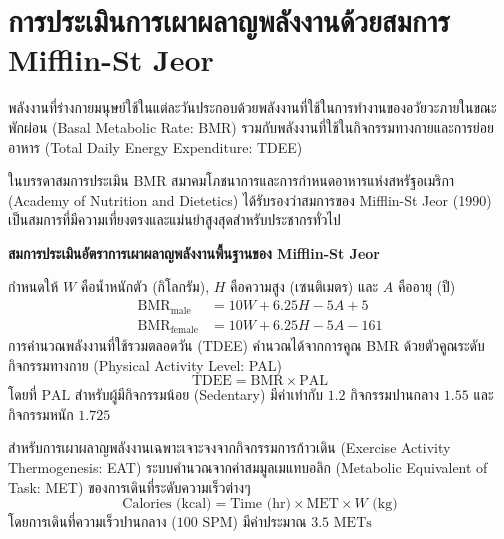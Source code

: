 \section{การประเมินการเผาผลาญพลังงานด้วยสมการ Mifflin-St Jeor}
พลังงานที่ร่างกายมนุษย์ใช้ในแต่ละวันประกอบด้วยพลังงานที่ใช้ในการทำงานของอวัยวะภายในขณะพักผ่อน (Basal Metabolic Rate: BMR) รวมกับพลังงานที่ใช้ในกิจกรรมทางกายและการย่อยอาหาร (Total Daily Energy Expenditure: TDEE)

ในบรรดาสมการประเมิน BMR สมาคมโภชนาการและการกำหนดอาหารแห่งสหรัฐอเมริกา (Academy of Nutrition and Dietetics) ได้รับรองว่าสมการของ Mifflin-St Jeor (1990) เป็นสมการที่มีความเที่ยงตรงและแม่นยำสูงสุดสำหรับประชากรทั่วไป

\begin{theorybox}
\textbf{สมการประเมินอัตราการเผาผลาญพลังงานพื้นฐานของ Mifflin-St Jeor}

กำหนดให้ $W$ คือน้ำหนักตัว (กิโลกรัม), $H$ คือความสูง (เซนติเมตร) และ $A$ คืออายุ (ปี)
\begin{align}
\text{BMR}_{\text{male}} &= 10W + 6.25H - 5A + 5 \\
\text{BMR}_{\text{female}} &= 10W + 6.25H - 5A - 161
\end{align}
การคำนวณพลังงานที่ใช้รวมตลอดวัน (TDEE) คำนวณได้จากการคูณ BMR ด้วยตัวคูณระดับกิจกรรมทางกาย (Physical Activity Level: PAL)
\begin{equation}
\text{TDEE} = \text{BMR} \times \text{PAL}
\end{equation}
โดยที่ $\text{PAL}$ สำหรับผู้มีกิจกรรมน้อย (Sedentary) มีค่าเท่ากับ $1.2$ กิจกรรมปานกลาง $1.55$ และกิจกรรมหนัก $1.725$
\end{theorybox}

สำหรับการเผาผลาญพลังงานเฉพาะเจาะจงจากกิจกรรมการก้าวเดิน (Exercise Activity Thermogenesis: EAT) ระบบคำนวณจากค่าสมมูลเมแทบอลิก (Metabolic Equivalent of Task: MET) ของการเดินที่ระดับความเร็วต่างๆ
\begin{equation}
\text{Calories (kcal)} = \text{Time (hr)} \times \text{MET} \times W\text{ (kg)}
\end{equation}
โดยการเดินที่ความเร็วปานกลาง ($100\text{ SPM}$) มีค่าประมาณ $3.5\text{ METs}$

